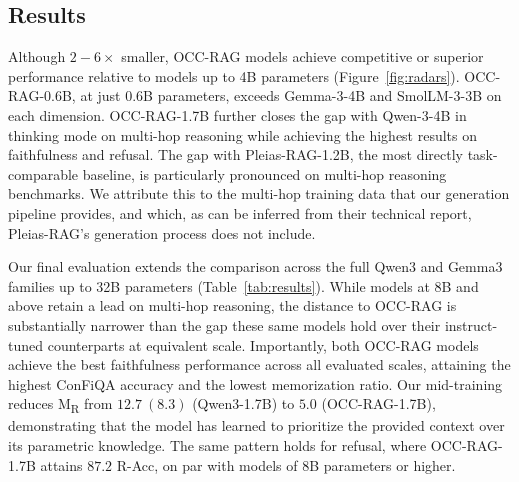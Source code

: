 \documentclass{llmxive}
\begin{document}
\subsection{Results}

Although $2-6\times$ smaller, OCC-RAG models achieve competitive or superior performance relative to models up to 4B parameters (Figure~\ref{fig:radars}). OCC-RAG-0.6B, at just 0.6B parameters, exceeds Gemma-3-4B and SmolLM-3-3B on each dimension. OCC-RAG-1.7B further closes the gap with Qwen-3-4B in thinking mode on multi-hop reasoning while achieving the highest results on faithfulness and refusal. The gap with Pleias-RAG-1.2B, the most directly task-comparable baseline, is particularly pronounced on multi-hop reasoning benchmarks. We attribute this to the multi-hop training data that our generation pipeline provides, and which, as can be inferred from their technical report, Pleias-RAG's generation process does not include.

Our final evaluation extends the comparison across the full Qwen3 and Gemma3 families up to 32B parameters (Table~\ref{tab:results}). While models at 8B and above retain a lead on multi-hop reasoning, the distance to OCC-RAG is substantially narrower than the gap these same models hold over their instruct-tuned counterparts at equivalent scale. Importantly, both OCC-RAG models achieve the best faithfulness performance across all evaluated scales, attaining the highest ConFiQA accuracy and the lowest memorization ratio. Our mid-training reduces M\textsubscript{R} from $12.7 \ (8.3)$ (Qwen3-1.7B) to $5.0$ (OCC-RAG-1.7B), demonstrating that the model has learned to prioritize the provided context over its parametric knowledge. The same pattern holds for refusal, where OCC-RAG-1.7B attains $87.2$ R-Acc, on par with models of 8B parameters or higher.
\end{document}

